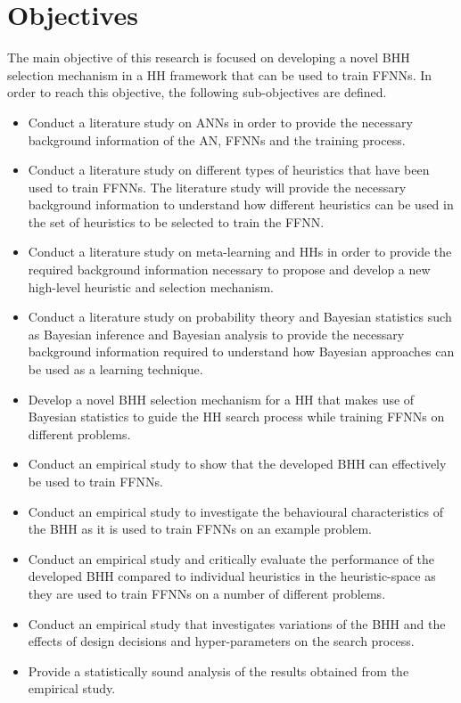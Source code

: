 \section{Objectives}\label{sec:introduction:objectives}

The main objective of this research is focused on developing a novel \Ac{BHH} selection mechanism in a \ac{HH} framework that can be used to train \acp{FFNN}. In order to reach this objective, the following sub-objectives are defined.

\begin{itemize}
      \item Conduct a literature study on \acp{ANN} in order to provide the necessary background information of the \ac{AN}, \acp{FFNN} and the training process.

      \item Conduct a literature study on different types of heuristics that have been used to train \acp{FFNN}. The literature study will provide the necessary background information to understand how different heuristics can be used in the set of heuristics to be selected to train the \ac{FFNN}.

      \item Conduct a literature study on meta-learning and \acp{HH} in order to provide the required background information necessary to propose and develop a new high-level heuristic and selection mechanism.

      \item Conduct a literature study on probability theory and Bayesian statistics such as Bayesian inference and Bayesian analysis to provide the necessary background information required to understand how Bayesian approaches can be used as a learning technique.

      \item Develop a novel \Ac{BHH} selection mechanism for a \ac{HH} that makes use of Bayesian statistics to guide the \ac{HH} search process while training \acp{FFNN} on different problems.

      \item Conduct an empirical study to show that the developed \Ac{BHH} can effectively be used to train \acp{FFNN}.

      \item Conduct an empirical study to investigate the behavioural characteristics of the \ac{BHH} as it is used to train \acp{FFNN} on an example problem.

      \item Conduct an empirical study and critically evaluate the performance of the developed \Ac{BHH} compared to individual heuristics in the heuristic-space as they are used to train \acp{FFNN} on a number of different problems.

      \item Conduct an empirical study that investigates variations of the \Ac{BHH} and the effects of design decisions and hyper-parameters on the search process.

      \item Provide a statistically sound analysis of the results obtained from the empirical study.
\end{itemize}

